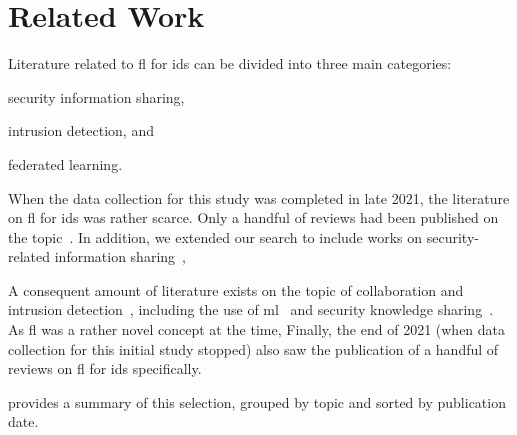 \section{Related Work\label{sec:sota.related}}

Literature related to \gls{fl} for \gls{ids} can be divided into three main categories: 
\begin{enumerate*}[(a)]
  \item security information sharing,
  \item intrusion detection, and
  \item federated learning.
\end{enumerate*}




When the data collection for this study was completed in late 2021, the literature on \gls{fl} for \gls{ids} was rather scarce.
Only a handful of reviews had been published on the topic~\cite{alazab_FederatedLearningCybersecurity_2021,agrawal_FederatedLearningIntrusion_2021,campos_EvaluatingFederatedLearning_2021}.
In addition, we extended our search to include works on security-related information sharing~\cite{skopik_problemsharedproblem_2016,tounsi_surveytechnicalthreat_2018,wagner_Cyberthreatintelligence_2019,pala_InformationSharingCybersecurity_2019}, 


A consequent amount of literature exists on the topic of collaboration and intrusion detection~\cite{zhou_surveycoordinatedattacks_2010,vasilomanolakis_TrustAwareCollaborativeIntrusion_2017}, including the use of \gls{ml}~\cite{buczak_SurveyDataMining_2016,meng_WhenIntrusionDetection_2018,chaabouni_NetworkIntrusionDetection_2019,dacosta_InternetThingssurvey_2019} and security knowledge sharing~\cite{}.
As \gls{fl} was a rather novel concept at the time, 
Finally, the end of 2021 (when data collection for this initial study stopped) also saw the publication of a handful of reviews on \gls{fl} for \gls{ids} specifically.

 provides a summary of this selection, grouped by topic and sorted by publication date.

